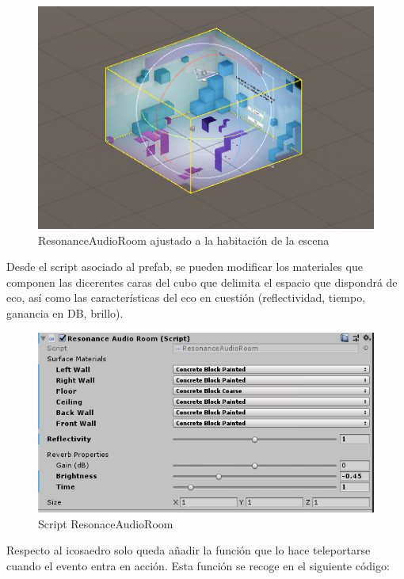\begin{figure}[htb]
	\centering
	\includegraphics[width=1\textwidth]{./imagenes/echoroom}
	\caption{ResonanceAudioRoom ajustado a la habitación de la escena}
\end{figure} 

\quad Desde el script asociado al prefab, se pueden modificar los materiales que componen las dicerentes caras del cubo que delimita el espacio que dispondrá de eco, así como las características del eco en cuestión (reflectividad, tiempo, ganancia en DB, brillo).\\

\begin{figure}[htb]
	\centering
	\includegraphics[width=1\textwidth]{./imagenes/audioroom}
	\caption{Script ResonaceAudioRoom}
\end{figure}


\quad Respecto al icosaedro solo queda añadir la función que lo hace teleportarse cuando el evento entra en acción. Esta función se recoge en el siguiente código:\\

